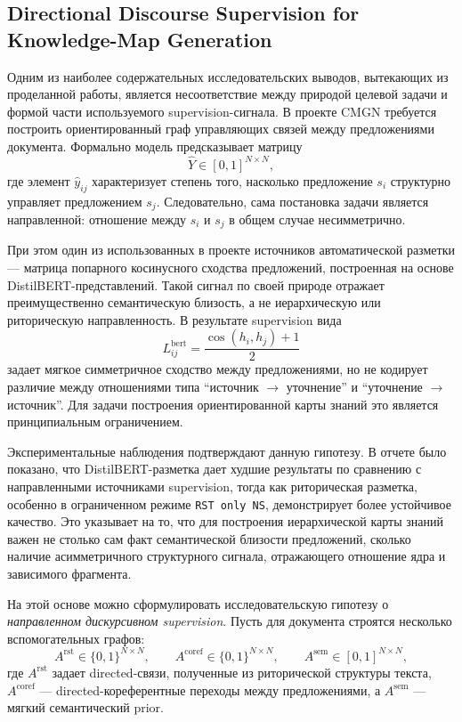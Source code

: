 \documentclass[12pt,a4paper]{article}
\begin{document}
\subsection{Directional Discourse Supervision for Knowledge-Map Generation}

Одним из наиболее содержательных исследовательских выводов, вытекающих из проделанной работы, является несоответствие между природой целевой задачи и формой части используемого supervision-сигнала. В проекте CMGN требуется построить ориентированный граф управляющих связей между предложениями документа. Формально модель предсказывает матрицу
\[
\hat{Y} \in [0,1]^{N \times N},
\]
где элемент $\hat{y}_{ij}$ характеризует степень того, насколько предложение $s_i$ структурно управляет предложением $s_j$. Следовательно, сама постановка задачи является направленной: отношение между $s_i$ и $s_j$ в общем случае несимметрично.

При этом один из использованных в проекте источников автоматической разметки --- матрица попарного косинусного сходства предложений, построенная на основе DistilBERT-представлений. Такой сигнал по своей природе отражает преимущественно семантическую близость, а не иерархическую или риторическую направленность. В результате supervision вида
\[
L^{\mathrm{bert}}_{ij} = \frac{\cos(h_i,h_j)+1}{2}
\]
задает мягкое симметричное сходство между предложениями, но не кодирует различие между отношениями типа ``источник $\rightarrow$ уточнение'' и ``уточнение $\rightarrow$ источник''. Для задачи построения ориентированной карты знаний это является принципиальным ограничением.

Экспериментальные наблюдения подтверждают данную гипотезу. В отчете было показано, что DistilBERT-разметка дает худшие результаты по сравнению с направленными источниками supervision, тогда как риторическая разметка, особенно в ограниченном режиме \texttt{RST only NS}, демонстрирует более устойчивое качество. Это указывает на то, что для построения иерархической карты знаний важен не столько сам факт семантической близости предложений, сколько наличие асимметричного структурного сигнала, отражающего отношение ядра и зависимого фрагмента.

На этой основе можно сформулировать исследовательскую гипотезу о \emph{направленном дискурсивном supervision}. Пусть для документа строятся несколько вспомогательных графов:
\[
A^{\mathrm{rst}} \in \{0,1\}^{N \times N}, \qquad
A^{\mathrm{coref}} \in \{0,1\}^{N \times N}, \qquad
A^{\mathrm{sem}} \in [0,1]^{N \times N},
\]
где $A^{\mathrm{rst}}$ задает directed-связи, полученные из риторической структуры текста, $A^{\mathrm{coref}}$ --- directed-кореферентные переходы между предложениями, а $A^{\mathrm{sem}}$ --- мягкий семантический prior.
\end{document}
